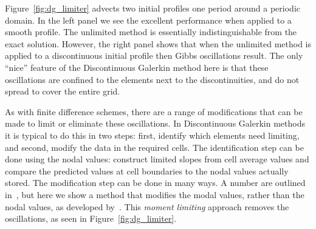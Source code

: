 Figure~\ref{fig:dg_limiter} advects two initial profiles one period around a
periodic domain. In the left panel we see the excellent performance when applied
to a smooth profile. The unlimited method is essentially indistinguishable from
the exact solution. However, the right panel shows that when the unlimited
method is applied to a discontinuous initial profile then Gibbs oscillations
result. The only ``nice'' feature of the Discontinuous Galerkin method here is
that these oscillations are confined to the elements next to the
discontinuities, and do not spread to cover the entire grid.

As with finite difference schemes, there are a range of modifications that can
be made to limit or eliminate these oscillations. In Discontinuous Galerkin
methods it is typical to do this in two steps: first, identify which elements
need limiting, and second, modify the data in the required cells. The
identification step can be done using the nodal values: construct limited slopes
from cell average values and compare the predicted values at cell boundaries to
the nodal values actually stored. The modification step can be done in many
ways. A number are outlined in~\cite{hesthaven2018numerical}, but here we show a
method that modifies the modal values, rather than the nodal values, as
developed by~\cite{biswas1994parallel}. This \emph{moment limiting} approach
removes the oscillations, as seen in Figure~\ref{fig:dg_limiter}.

